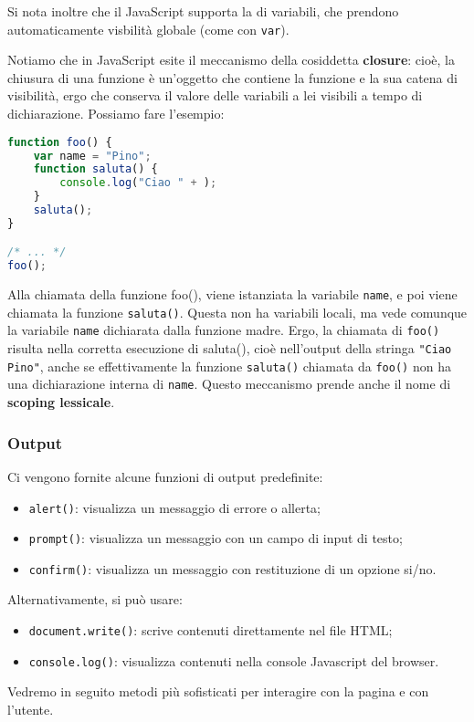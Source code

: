 \documentclass[a4paper,11pt]{article}
\begin{document}
Si nota inoltre che il JavaScript supporta la  di variabili, che prendono automaticamente visbilità globale (come con \lstinline|var|).

Notiamo che in JavaScript esite il meccanismo della cosiddetta \textbf{closure}: cioè, la chiusura di una funzione è un'oggetto che contiene la funzione e la sua catena di visibilità, ergo che conserva il valore delle variabili a lei visibili a tempo di dichiarazione.
Possiamo fare l'esempio:
\begin{lstlisting}[language=javascript, style=codestyle]	
function foo() {
	var name = "Pino";
	function saluta() {
		console.log("Ciao " + );
	}
	saluta();
}

/* ... */
foo();
\end{lstlisting}

Alla chiamata della funzione foo(), viene istanziata la variabile \lstinline|name|, e poi viene chiamata la funzione \lstinline|saluta()|.
Questa non ha variabili locali, ma vede comunque la variabile \lstinline|name| dichiarata dalla funzione madre.
Ergo, la chiamata di \lstinline|foo()| risulta nella corretta esecuzione di saluta(), cioè nell'output della stringa \lstinline|"Ciao Pino"|, anche se effettivamente la funzione \lstinline|saluta()| chiamata da \lstinline|foo()| non ha una dichiarazione interna di \lstinline|name|.
Questo meccanismo prende anche il nome di \textbf{scoping lessicale}.

\subsubsection{Output}
Ci vengono fornite alcune funzioni di output predefinite:
\begin{itemize}
	\item \lstinline|alert()|: visualizza un messaggio di errore o allerta;
	\item \lstinline|prompt()|: visualizza un messaggio con un campo di input di testo;
	\item \lstinline|confirm()|: visualizza un messaggio con restituzione di un opzione si/no.
\end{itemize}

Alternativamente, si può usare:
\begin{itemize}
	\item \lstinline|document.write()|: scrive contenuti direttamente nel file HTML;
	\item \lstinline|console.log()|: visualizza contenuti nella console Javascript del browser.
\end{itemize}

Vedremo in seguito metodi più sofisticati per interagire con la pagina e con l'utente.
\end{document}
